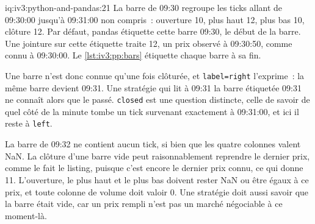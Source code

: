 \begin{solution}{iq:iv3:python-and-pandas:21}
La barre de 09:30 regroupe les ticks allant de 09:30:00 jusqu'à 09:31:00 non compris~: ouverture 10, plus haut 12, plus bas 10, clôture 12. Par défaut, pandas étiquette cette barre 09:30, le début de la barre. Une jointure sur cette étiquette traite 12, un prix observé à 09:30:50, comme connu à 09:30:00. Le \cref{lst:iv3:pp:bars} étiquette chaque barre à sa fin.
\label{lst:iv3:pp:bars}

Une barre n'est donc connue qu'une fois clôturée, et \texttt{label=\textquotesingle right\textquotesingle} l'exprime~: la même barre devient 09:31. Une stratégie qui lit à 09:31 la barre étiquetée 09:31 ne connaît alors que le passé. \texttt{closed} est une question distincte, celle de savoir de quel côté de la minute tombe un tick survenant exactement à 09:31:00, et ici il reste à \texttt{left}.

La barre de 09:32 ne contient aucun tick, si bien que les quatre colonnes valent NaN. La clôture d'une barre vide peut raisonnablement reprendre le dernier prix, comme le fait le listing, puisque c'est encore le dernier prix connu, ce qui donne 11. L'ouverture, le plus haut et le plus bas doivent rester NaN ou être égaux à ce prix, et toute colonne de volume doit valoir 0. Une stratégie doit aussi savoir que la barre était vide, car un prix rempli n'est pas un marché négociable à ce moment-là.

\end{solution}

